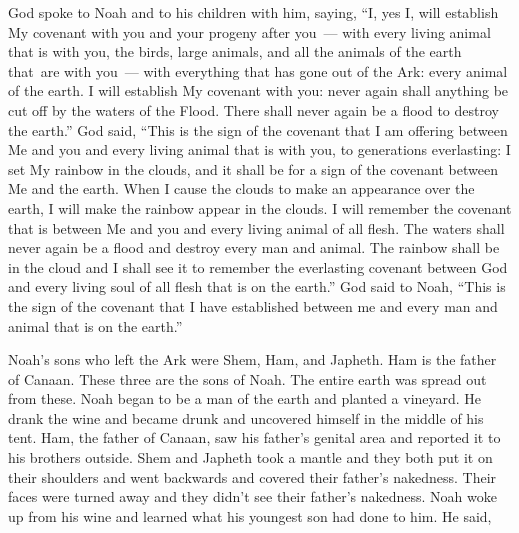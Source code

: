 \begin{inparaenum}
   God spoke to Noah and to his children with him, saying,%
   ``I, yes I, will establish My covenant with you and your progeny after you~---%
   with every living animal that is with you, the birds, large animals, and all the animals of the earth that\understood{}\ are with you~--- with everything that has gone out of the Ark: every animal of the earth.%
   I will establish My covenant with you: never again shall anything be cut off by the waters of the Flood. There shall never again be a flood to destroy the earth.''%
   God said, ``This is the sign of the covenant that I am offering between Me and you and every living animal that is with you, to generations everlasting:%
   I set My rainbow in the clouds, and it shall be for a sign of the covenant between Me and the earth.%
   When I cause the clouds to make an appearance over the earth, I will make the rainbow appear in the clouds.%
   I will remember the covenant that is between Me and you and every living animal of all flesh. The waters shall never again be a flood and destroy every man and animal.%
   The rainbow shall be in the cloud and I shall see it to remember the everlasting covenant between God and every living soul of all flesh that is on the earth.''%
   God said to Noah, ``This is the sign of the covenant that I have established between me and every man and animal that is on the earth.''%

   Noah's sons who left the Ark were Shem, Ham, and Japheth. Ham is the father of Canaan.%
   These three are the sons of Noah. The entire earth was spread out from these.%
   Noah began to be a man of the earth and planted a vineyard.%
   He drank the wine and became drunk and uncovered himself in the middle of his tent.%
   Ham, the father of Canaan, saw his father's genital area and reported it to his brothers outside.%
   Shem and Japheth took a mantle and they both put it on their shoulders and went backwards and covered their father's nakedness. Their faces were turned away and they didn't see their father's nakedness.%
   Noah woke up from his wine and learned what his youngest son had done to him.%
   He said,%


\end{inparaenum}
